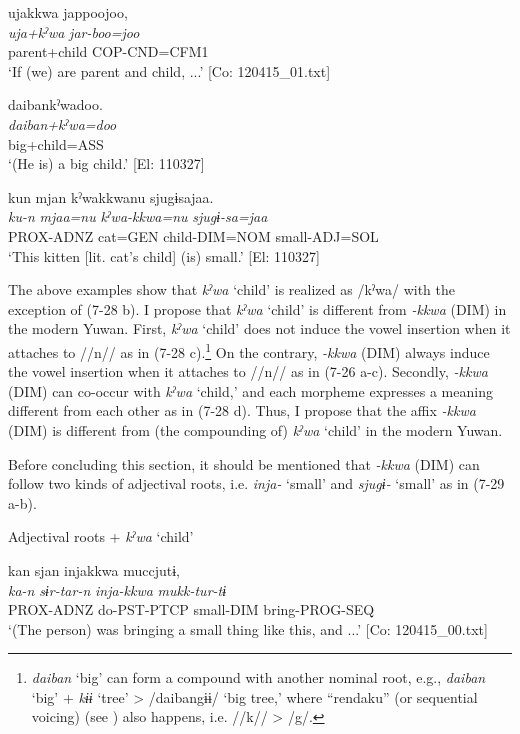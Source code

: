 \ex \label{ex:7:b}%
\glll  ujakkwa  jappoojoo,\\
\textit{uja+kˀwa}  \textit{jar-boo=joo}\\
parent+child  COP-CND=CFM1\\
\glt ‘If (we) are parent and child, ...’ [Co: 120415\_01.txt]

\ex \label{ex:7:c}%
\glll  daibankˀwadoo.\\
\textit{daiban+kˀwa=doo}\\
big+child=ASS\\
\glt ‘(He is) a big child.’ [El: 110327]

\ex \label{ex:7:d}%
\glll  kun  mjan  kˀwakkwanu  sjugɨsajaa.\\
\textit{ku-n}  \textit{mjaa=nu}  \textit{kˀwa-kkwa=nu}  \textit{sjugɨ-sa=jaa}\\
PROX-ADNZ  cat=GEN  child-DIM=NOM  small-ADJ=SOL\\
\glt ‘This kitten [lit. cat’s child] (is) small.’ [El: 110327]
\z
\z

The above examples show that \textit{kˀwa} ‘child’ is realized as /kˀwa/ with the exception of (7-28 b). I propose that \textit{kˀwa} ‘child’ is different from \textit{{}-kkwa} (DIM) in the modern Yuwan. First, \textit{kˀwa} ‘child’ does not induce the vowel insertion when it attaches to //n// as in (7-28 c).\footnote{\textit{daiban} ‘big’ can form a compound with another nominal root, e.g., \textit{daiban} ‘big’ + \textit{kɨɨ} ‘tree’ > /daibangɨɨ/ ‘big tree,’ where “rendaku” (or sequential voicing) (see ) also happens, i.e. //k// > /g/.} On the contrary, \textit{{}-kkwa} (DIM) always induce the vowel insertion when it attaches to //n// as in (7-26 a-c). Secondly, \textit{{}-kkwa} (DIM) can co-occur with \textit{kˀwa} ‘child,’ and each morpheme expresses a meaning different from each other as in (7-28 d). Thus, I propose that the affix \textit{{}-kkwa} (DIM) is different from (the compounding of) \textit{kˀwa} ‘child’ in the modern Yuwan.

  Before concluding this section, it should be mentioned that \textit{{}-kkwa} (DIM) can follow two kinds of adjectival roots, i.e. \textit{inja-} ‘small’ and \textit{sjugɨ-} ‘small’ as in (7-29 a-b).

\ea \label{ex:7:29}  Adjectival roots + \textit{kˀwa} ‘child’

\ea \label{ex:7:a}%
\glll  kan  sjan  injakkwa  muccjutɨ,\\
\textit{ka-n}  \textit{sɨr-tar-n}  \textit{inja-kkwa}  \textit{mukk-tur-tɨ}\\
PROX-ADNZ  do-PST-PTCP  small-DIM  bring-PROG-SEQ\\
\glt ‘(The person) was bringing a small thing like this, and ...’ [Co: 120415\_00.txt]

